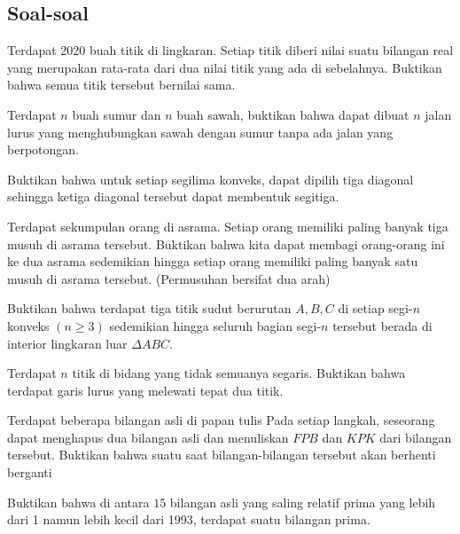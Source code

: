 \documentclass[11pt]{scrartcl}
\begin{document}
\subsection{Soal-soal}
    \begin{problem}
        Terdapat 2020 buah titik di lingkaran. Setiap titik diberi nilai suatu bilangan real yang merupakan rata-rata dari dua nilai titik yang ada di sebelahnya. Buktikan bahwa semua titik tersebut bernilai sama.    
    \end{problem}
    
    \begin{problem}
        Terdapat $n$ buah sumur dan $n$ buah sawah, buktikan bahwa dapat dibuat $n$ jalan lurus yang menghubungkan sawah dengan sumur tanpa ada jalan yang berpotongan.    
    \end{problem}
    
    \begin{problem}
        Buktikan bahwa untuk setiap segilima konveks, dapat dipilih tiga diagonal sehingga ketiga diagonal tersebut dapat membentuk segitiga.    
    \end{problem}
    
    \begin{problem}
        Terdapat sekumpulan orang di asrama. Setiap orang memiliki paling banyak tiga musuh di asrama tersebut. Buktikan bahwa kita dapat membagi orang-orang ini ke dua asrama sedemikian hingga setiap orang memiliki paling banyak satu musuh di asrama tersebut. (Permusuhan bersifat dua arah)
    \end{problem}
    
    \begin{problem}
        Buktikan bahwa terdapat tiga titik sudut berurutan $A,B,C$ di setiap segi-$n$ konveks $(n\geq 3)$ sedemikian hingga seluruh bagian segi-$n$ tersebut berada di interior lingkaran luar $\Delta ABC$.    
    \end{problem}
    
    \begin{problem}
        Terdapat $n$ titik di bidang yang tidak semuanya segaris. Buktikan bahwa terdapat garis lurus yang melewati tepat dua titik.    
    \end{problem}
    
    \begin{problem}
        Terdapat beberapa bilangan asli di papan tulis Pada setiap langkah, seseorang dapat menghapus dua bilangan asli dan menuliskan $FPB$ dan $KPK$ dari bilangan tersebut. Buktikan bahwa suatu saat bilangan-bilangan tersebut akan berhenti berganti        
    \end{problem}
    
    \begin{problem}
        Buktikan bahwa di antara $15$ bilangan asli yang saling relatif prima yang lebih dari 1 namun lebih kecil dari 1993, terdapat suatu bilangan prima.    
    \end{problem}
\end{document}
